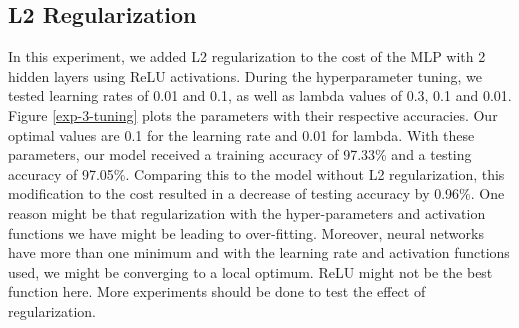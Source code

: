 \documentclass[11pt]{homework}
\begin{document}
\subsection{L2 Regularization}
In this experiment, we added L2 regularization to the cost of the MLP with 2 hidden layers using ReLU activations. During the hyperparameter tuning, we tested learning rates of 0.01 and 0.1, as well as lambda values of 0.3, 0.1 and 0.01. Figure \ref{exp-3-tuning} plots the parameters with their respective accuracies. Our optimal values are 0.1 for the learning rate and 0.01 for lambda. With these parameters, our model received a training accuracy of 97.33\% and a testing accuracy of 97.05\%. Comparing this to the model without L2 regularization, this modification to the cost resulted in a decrease of testing accuracy by 0.96\%. One reason might be that regularization with the hyper-parameters and activation functions we have might be leading to over-fitting. Moreover, neural networks have more than one minimum and with the learning rate and activation functions used, we might be converging to a local optimum. ReLU might not be the best function here. More experiments should be done to test the effect of regularization. 
\end{document}
